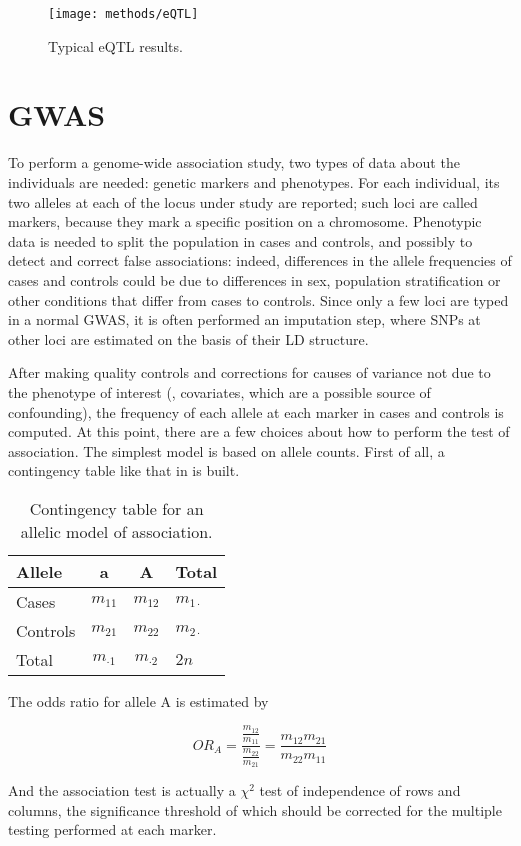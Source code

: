 \documentclass[../main.tex]{subfiles}
\begin{document}
\begin{figure}
	\texttt{[image: methods/eQTL]}
	\caption{Typical eQTL results.}
\end{figure}

\section{GWAS}

To perform a genome-wide association study\cite{Clarke2011}, two types 
of data about the individuals are needed: genetic markers and 
phenotypes. For each individual, its two alleles at each of the locus 
under study are reported; such loci are called markers, because they 
mark a specific position on a chromosome. Phenotypic data is needed to 
split the population in cases and controls, and possibly to detect and 
correct false associations: indeed, differences in the allele 
frequencies of cases and controls could be due to differences in sex, 
population stratification or other conditions that differ from cases to 
controls\cite{Price2006}. Since only a few loci are typed in a normal 
GWAS, it is often performed an imputation step, where SNPs at other loci 
are estimated on the basis of their LD structure.

After making quality controls and corrections for causes of variance not 
due to the phenotype of interest (\ie, covariates, which are a possible 
source of confounding), the frequency of each allele at each marker in 
cases and controls is computed. At this point, there are a few choices 
about how to perform the test of association. The simplest model is 
based on allele counts. First of all, a contingency table like that in 
 is built.

\begin{table}
	\begin{tabular}{ l c c l}
		\toprule
		Allele & a & A & Total \\
		\midrule
		Cases & $m_{11}$ & $m_{12}$ & $m_{1\cdot}$ \\
		Controls & $m_{21}$ & $m_{22}$ & $m_{2\cdot}$ \\
		Total & $m_{\cdot1}$ & $m_{\cdot2}$ & $2n$ \\
		\bottomrule
	\end{tabular}
	\caption{Contingency table for an allelic model of association.}
\end{table}

The odds ratio for allele A is estimated by

\begin{equation}
	OR_A = \frac{\frac{m_{12}}{m_{11}}}{\frac{m_{22}}{m_{21}}} =
		\frac{m_{12}m_{21}}{m_{22}m_{11}}
\end{equation}

And the association test is actually a $\chi^2$ test of independence of 
rows and columns, the significance threshold of which should be 
corrected for the multiple testing performed at each marker.

\end{document}
